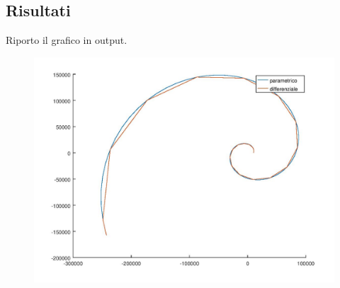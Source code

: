 \documentclass{article}
\begin{document}
	\subsection{Risultati}
	Riporto il grafico in output.\\
	\begin{figure}[htp!]
		\centering 
		\includegraphics[width=\textwidth]{7_2.jpeg}
	\end{figure}
\end{document}
